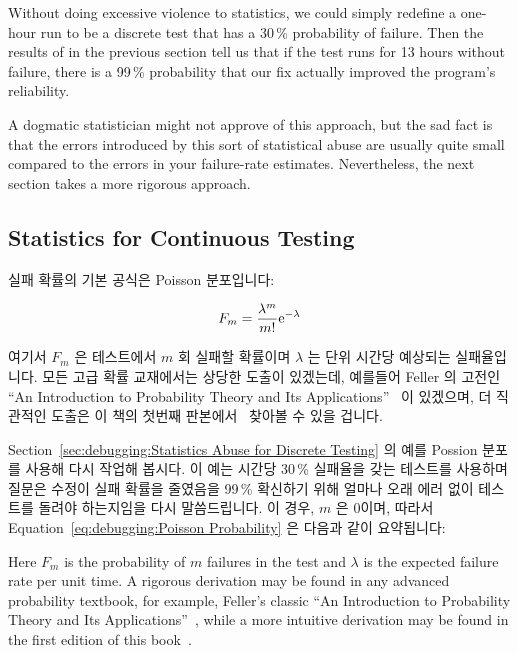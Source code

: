 Without doing excessive violence to statistics, we could simply
redefine a one-hour run to be a discrete test that has a 30\,\%
probability of failure.
Then the results of in the previous section tell us that if the test
runs for 13 hours without failure, there is a 99\,\% probability that
our fix actually improved the program's reliability.

A dogmatic statistician might not approve of this approach, but the sad
fact is that the errors introduced by this sort of statistical abuse are
usually quite small compared to the errors in your failure-rate estimates.
Nevertheless, the next section takes a more rigorous approach.

\fi

\subsection{Statistics for Continuous Testing}
\label{sec:debuggingStatistics for Continuous Testing}

실패 확률의 기본 공식은 Poisson 분포입니다:

\begin{equation}
	F_m = \frac{\lambda^m}{m!} \mathrm{e}^{-\lambda}
\label{eq:debugging:Poisson Probability}
\end{equation}

여기서 $F_m$ 은 테스트에서 $m$ 회 실패할 확률이며 $\lambda$ 는 단위 시간당
예상되는 실패율입니다.
모든 고급 확률 교재에서는 상당한 도출이 있겠는데, 예를들어 Feller 의 고전인
``An Introduction to Probability Theory and Its Applications''~\cite{Feller58}
이 있겠으며, 더 직관적인 도출은 이 책의 첫번째
판본에서~\cite[Equations 11.8--11.26]{McKenney2014ParallelProgramming-e1}
찾아볼 수 있을 겁니다.

Section~\ref{sec:debugging:Statistics Abuse for Discrete Testing}
의 예를 Possion 분포를 사용해 다시 작업해 봅시다.
이 예는 시간당 30\,\% 실패율을 갖는 테스트를 사용하며 질문은 수정이 실패 확률을
줄였음을 99\,\% 확신하기 위해 얼마나 오래 에러 없이 테스트를 돌려야
하는지임을 다시 말씀드립니다.
이 경우, $m$ 은 0이며, 따라서 Equation~\ref{eq:debugging:Poisson Probability}
은 다음과 같이 요약됩니다:

\iffalse

Here $F_m$ is the probability of $m$ failures in the test and
$\lambda$ is the expected failure rate per unit time.
A rigorous derivation may be found in any advanced probability
textbook, for example, Feller's classic ``An Introduction to Probability
Theory and Its Applications''~\cite{Feller58}, while a more
intuitive derivation may be found in the first edition of
this book~\cite[Equations 11.8--11.26]{McKenney2014ParallelProgramming-e1}.

